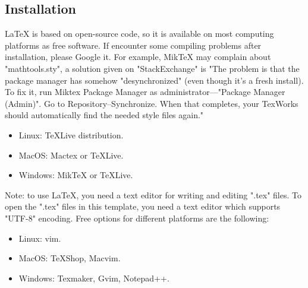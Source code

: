\subsection{Installation}
LaTeX is based on open-source code, so it is available on most computing platforms as free software. If encounter some compiling problems after installation, please Google it. For example, MikTeX may complain about "mathtools.sty", a solution given on "StackExchange" is "The problem is that the package manager has somehow "desynchronized" (even though it's a fresh install). To fix it, run Miktex Package Manager as administrator---"Package Manager (Admin)". Go to Repository--Synchronize. When that completes, your TexWorks should automatically find the needed style files again."
\begin{itemize}
    \item Linux: TeXLive distribution. 
    \item MacOS: Mactex or TeXLive.
    \item Windows: MikTeX or TeXLive. 
\end{itemize}

Note: to use \LaTeX{}, you need a text editor for writing and editing ".tex" files. To open the ".tex" files in this template, you need a text editor which supports "UTF-8" encoding. Free options for different platforms are the following:
\begin{itemize}
    \item Linux: vim. 
    \item MacOS: TeXShop, Macvim.
    \item Windows: Texmaker, Gvim, Notepad++. 
\end{itemize}

